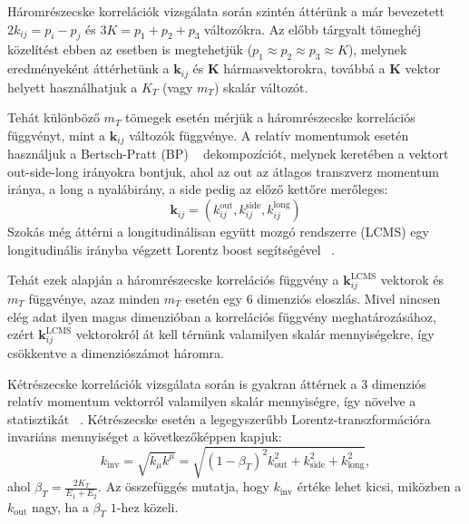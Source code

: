 \documentclass[11pt,a4paper]{article}
\numberwithin{equation}{subsection}
\numberwithin{figure}{section}
\begin{document}
Háromrészecske korrelációk vizsgálata során szintén áttérünk a már bevezetett $2k_{ij}=p_i-p_j$ és  $3K=p_1+p_2+p_3$ változókra. Az előbb tárgyalt tömeghéj közelítést ebben az esetben is megtehetjük ($p_1\approx p_2\approx p_3 \approx K$), melynek eredményeként áttérhetünk a $\bm{k}_{ij}$ és $\bm{K}$ hármasvektorokra, továbbá a $\bm{K}$ vektor helyett használhatjuk a $K_T$ (vagy $m_T$) skalár változót.

Tehát különböző $m_T$ tömegek esetén mérjük a háromrészecske korrelációs függvényt, mint a $\bm{k}_{ij}$ változók függvénye. A relatív momentumok esetén használjuk a  Bertsch-Pratt (BP) ~\cite{Pratt:1986ev,Bertsch:1988db} dekompozíciót, melynek keretében a vektort out-side-long irányokra bontjuk, ahol az out az átlagos transzverz momentum iránya, a long a nyalábirány, a side pedig az előző kettőre merőleges:
\begin{equation}
\bm{k}_{ij} = (k_{ij}^{\mathrm{out}}, k_{ij}^{\mathrm{side}}, k_{ij}^{\mathrm{long}})
\end{equation}
 Szokás még áttérni a longitudinálisan együtt mozgó rendszerre (LCMS) egy longitudinális irányba végzett Lorentz boost segítségével ~\cite{Wiedemann:1999qn}.

Tehát ezek alapján a háromrészecske korrelációs függvény a $\bm{k}_{ij}^{\mathrm{LCMS}}$ vektorok és $m_T$ függvénye, azaz minden $m_T$ esetén egy $6$ dimenziós eloszlás. Mivel nincsen elég adat ilyen magas dimenzióban a korrelációs függvény meghatározásához, ezért $\bm{k}_{ij}^{\mathrm{LCMS}}$ vektorokról át kell térnünk valamilyen skalár mennyiségekre, így csökkentve a dimenziószámot háromra.

Kétrészecske korrelációk vizsgálata során is gyakran áttérnek a $3$ dimenziós relatív momentum vektorról valamilyen skalár mennyiségre, így növelve a statisztikát ~\cite{Achard:2011zza, Khachatryan:2011hi}. Kétrészecske esetén a legegyszerűbb Lorentz-transzformációra invariáns mennyiséget a következőképpen kapjuk:
\begin{equation}
k_{\mathrm{inv}} = \sqrt{k_\mu k^\mu} = \sqrt{(1-\beta_T)^2k_{\mathrm{out}}^2+k_{\mathrm{side}}^2+k_{\mathrm{long}}^2},
\end{equation}
ahol $\beta_T=\frac{2K_T}{E_1+E_2}$. Az összefüggés mutatja, hogy $k_{\mathrm{inv}}$ értéke lehet kicsi, miközben a $k_{\mathrm{out}}$ nagy, ha a $\beta_T$ $1$-hez közeli.
\end{document}
